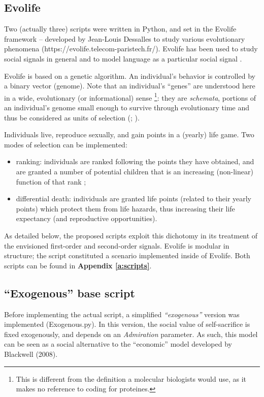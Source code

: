 \documentclass[a4paper,12pt]{report}
\begin{document}
\subsection{Evolife}
Two (actually three) scripts were written in Python, and set in the Evolife framework
– developed by Jean-Louis Dessalles to study various evolutionary phenomena
(https://evolife.telecom-paristech.fr/). Evolife has been used to study social
signals in general \cite{dessalles_optimal_2014} and to model language as a particular social signal
\cite{dessalles_language:_2017}.

Evolife is based on a genetic algorithm.
An individual's behavior is controlled by a binary vector (genome).
Note that an individual’s “genes” are understood here in a wide, evolutionary
(or informational) sense
\footnote{This is different from the definition a molecular biologists would use,
as it makes no reference to coding for proteines.}:
they are \emph{schemata}, portions of an
individual’s genome small enough to survive through evolutionary time and thus
be considered as units of selection (; ).

Individuals live, reproduce sexually, and gain points in a (yearly) life game.
Two modes of selection can be implemented:
\begin{itemize}
    \item ranking: individuals are ranked following the points they have
    obtained, and are granted a number of potential children that is an 
    increasing (non-linear) function of that rank ;
    \item differential death: individuals are granted life points
    (related to their
    yearly points) which protect them from life hazards, thus increasing
    their life expectancy (and reproductive opportunities).
\end{itemize}

As detailed below,
the proposed scripts exploit
this dichotomy in its treatment of the envisioned
first-order and second-order signals. Evolife is modular in structure;
the script constituted a scenario implemented inside of Evolife.
Both scripts can be found in \textbf{Appendix 
    \ref{a:scripts}}.

\subsection{“Exogenous” base script}
Before implementing the actual script, a simplified \emph{“exogenous”} version was
implemented (Exogenous.py). In this version, the social value of self-sacrifice
is fixed exogenously, and depends on an \emph{Admiration} parameter.
As such, this model can be seen as a social alternative to the
“economic” model developed by Blackwell (2008).
\end{document}
